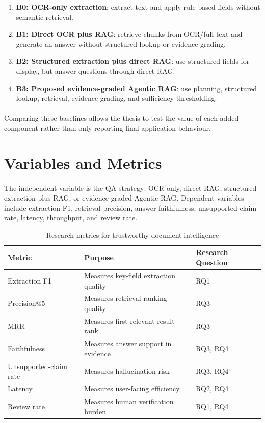 \begin{enumerate}
    \item \textbf{B0: OCR-only extraction}: extract text and apply rule-based fields without semantic retrieval.
    \item \textbf{B1: Direct OCR plus RAG}: retrieve chunks from OCR/full text and generate an answer without structured lookup or evidence grading.
    \item \textbf{B2: Structured extraction plus direct RAG}: use structured fields for display, but answer questions through direct RAG.
    \item \textbf{B3: Proposed evidence-graded Agentic RAG}: use planning, structured lookup, retrieval, evidence grading, and sufficiency thresholding.
\end{enumerate}

\paragraph{} Comparing these baselines allows the thesis to test the value of each added component rather than only reporting final application behaviour.

\section{Variables and Metrics}
\paragraph{} The independent variable is the QA strategy: OCR-only, direct RAG, structured extraction plus RAG, or evidence-graded Agentic RAG. Dependent variables include extraction F1, retrieval precision, answer faithfulness, unsupported-claim rate, latency, throughput, and review rate.

\begin{table}[h]
\centering
\begin{tabular}{lll}
\toprule
\textbf{Metric} & \textbf{Purpose} & \textbf{Research Question} \\
\midrule
Extraction F1 & Measures key-field extraction quality & RQ1 \\
Precision@5 & Measures retrieval ranking quality & RQ3 \\
MRR & Measures first relevant result rank & RQ3 \\
Faithfulness & Measures answer support in evidence & RQ3, RQ4 \\
Unsupported-claim rate & Measures hallucination risk & RQ3, RQ4 \\
Latency & Measures user-facing efficiency & RQ2, RQ4 \\
Review rate & Measures human verification burden & RQ1, RQ4 \\
\bottomrule
\end{tabular}
\caption{Research metrics for trustworthy document intelligence}
\label{tab:technology_stack}
\end{table}

